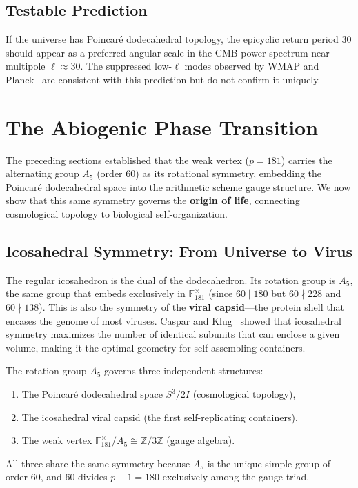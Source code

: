\subsection{Testable Prediction}

If the universe has Poincar\'{e} dodecahedral topology, the epicyclic return period $30$ should appear as a preferred angular scale in the CMB power spectrum near multipole $\ell \approx 30$. The suppressed low-$\ell$ modes observed by WMAP and Planck~\cite{planck2020} are consistent with this prediction but do not confirm it uniquely.

\section{The Abiogenic Phase Transition}

The preceding sections established that the weak vertex ($p = 181$) carries the alternating group $A_5$ (order 60) as its rotational symmetry, embedding the Poincar\'{e} dodecahedral space into the arithmetic scheme gauge structure. We now show that this same symmetry governs the \textbf{origin of life}, connecting cosmological topology to biological self-organization.

\subsection{Icosahedral Symmetry: From Universe to Virus}

The regular icosahedron is the dual of the dodecahedron. Its rotation group is $A_5$, the same group that embeds exclusively in $\mathbb{F}_{181}^{\times}$ (since $60 \mid 180$ but $60 \nmid 228$ and $60 \nmid 138$). This is also the symmetry of the \textbf{viral capsid}---the protein shell that encases the genome of most viruses. Caspar and Klug~\cite{caspar1962} showed that icosahedral symmetry maximizes the number of identical subunits that can enclose a given volume, making it the optimal geometry for self-assembling containers.

\begin{theorem}
The rotation group $A_5$ governs three independent structures:
\begin{enumerate}
    \item The Poincar\'{e} dodecahedral space $S^3/2I$ (cosmological topology),
    \item The icosahedral viral capsid (the first self-replicating containers),
    \item The weak vertex $\mathbb{F}_{181}^{\times}/A_5 \cong \mathbb{Z}/3\mathbb{Z}$ (gauge algebra).
\end{enumerate}
All three share the same symmetry because $A_5$ is the unique simple group of order 60, and 60 divides $p - 1 = 180$ exclusively among the gauge triad.
\end{theorem}

